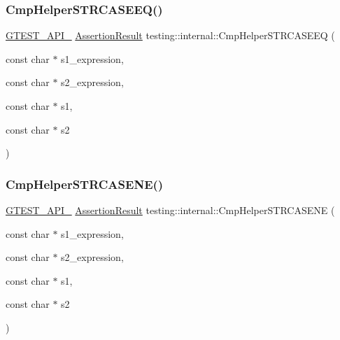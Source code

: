 \mbox{\label{namespacetesting_1_1internal_a00c3d012df6173622ef558a131bfb95d}} 
\subsubsection{\texorpdfstring{CmpHelperSTRCASEEQ()}{CmpHelperSTRCASEEQ()}}
{\footnotesize\ttfamily \mbox{\hyperlink{gtest-port_8h_aa73be6f0ba4a7456180a94904ce17790}{G\+T\+E\+S\+T\+\_\+\+A\+P\+I\+\_\+}} \mbox{\hyperlink{classtesting_1_1_assertion_result}{Assertion\+Result}} testing\+::internal\+::\+Cmp\+Helper\+S\+T\+R\+C\+A\+S\+E\+EQ (\begin{DoxyParamCaption}\item[{const char $\ast$}]{s1\+\_\+expression,  }\item[{const char $\ast$}]{s2\+\_\+expression,  }\item[{const char $\ast$}]{s1,  }\item[{const char $\ast$}]{s2 }\end{DoxyParamCaption})}

\mbox{\label{namespacetesting_1_1internal_a5f74b933606b0a742cd5a8ad2d7087e0}} 
\subsubsection{\texorpdfstring{CmpHelperSTRCASENE()}{CmpHelperSTRCASENE()}}
{\footnotesize\ttfamily \mbox{\hyperlink{gtest-port_8h_aa73be6f0ba4a7456180a94904ce17790}{G\+T\+E\+S\+T\+\_\+\+A\+P\+I\+\_\+}} \mbox{\hyperlink{classtesting_1_1_assertion_result}{Assertion\+Result}} testing\+::internal\+::\+Cmp\+Helper\+S\+T\+R\+C\+A\+S\+E\+NE (\begin{DoxyParamCaption}\item[{const char $\ast$}]{s1\+\_\+expression,  }\item[{const char $\ast$}]{s2\+\_\+expression,  }\item[{const char $\ast$}]{s1,  }\item[{const char $\ast$}]{s2 }\end{DoxyParamCaption})}

